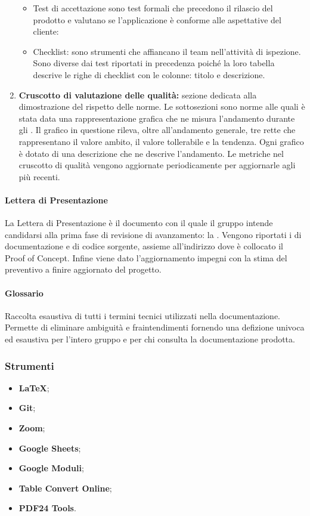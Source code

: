 \begin{enumerate}
\begin{itemize}
    \item Test di accettazione sono test formali che precedono il rilascio del prodotto e valutano se l’applicazione è conforme alle aspettative del cliente:
    \item Checklist: sono strumenti che affiancano il team nell'attività di ispezione. Sono diverse dai test riportati in precedenza poiché la loro tabella descrive le righe di checklist con le colonne: titolo e descrizione.
  \end{itemize}
  \item \textbf{Cruscotto di valutazione delle qualità:} sezione dedicata alla dimostrazione del rispetto delle norme. Le sottosezioni sono norme alle quali è stata data una rappresentazione grafica che ne misura l'andamento durante gli . Il grafico in questione rileva, oltre all'andamento generale, tre rette che rappresentano il valore ambito, il valore tollerabile e la tendenza. Ogni grafico è dotato di una descrizione che ne descrive l'andamento. Le metriche nel cruscotto di qualità vengono aggiornate periodicamente per aggiornarle agli  più recenti.
\end{enumerate}

\paragraph{Lettera di Presentazione}
La Lettera di Presentazione è il documento con il quale il gruppo intende candidarsi alla prima fase di revisione di avanzamento: la \RTB. Vengono riportati i  di documentazione e di codice sorgente, assieme all'indirizzo dove è collocato il Proof of Concept. Infine viene dato l'aggiornamento impegni con la stima del preventivo a finire aggiornato del progetto.

\paragraph{Glossario}
Raccolta esaustiva di tutti i termini tecnici utilizzati nella documentazione. Permette di eliminare ambiguità e fraintendimenti fornendo una defizione univoca ed esaustiva per l'intero gruppo e per chi consulta la documentazione prodotta.

\subsubsection{Strumenti}
\IntroStrumenti
\begin{itemize}
  \item \textbf{LaTeX};
  \item \textbf{Git};
  \item \textbf{Zoom};
  \item \textbf{Google Sheets};
  \item \textbf{Google Moduli};
  \item \textbf{Table Convert Online};
  \item \textbf{PDF24 Tools}.
\end{itemize}

